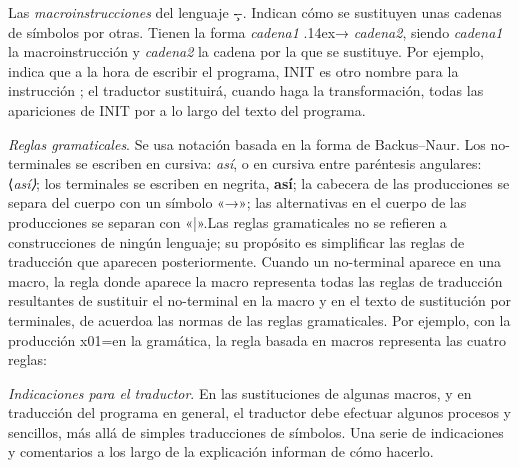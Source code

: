 \listademos
{}

Las {\it macroinstrucciones} del lenguaje \c--. Indican cómo se sustituyen unas cadenas de símbolos
por otras. Tienen la forma {\hskip3pt{\it cadena1} {\fflecha\lower.14ex\hbox{→}} {\it cadena2}},
siendo {\it cadena1} la macroinstrucción y {\it cadena2} la cadena por la que se sustituye. Por
ejemplo,  indica que a la hora de escribir el programa, {\fcode INIT} es otro
nombre para la instrucción {}; el traductor sustituirá, cuando haga la transformación, todas
las apariciones de {\fcode INIT} por {} a lo largo del texto del programa.

{\it Reglas gramaticales}. Se usa notación basada en la forma de Backus–Naur.  Los no-terminales se
escriben en cursiva: {\it así}, o en cursiva entre paréntesis angulares: {\fcode⟨\it así\fcode⟩};
los terminales se escriben en negrita, {\bf así}; la cabecera de las producciones se separa del
cuerpo con un símbolo «→»; las alternativas en el cuerpo de las producciones se separan con
«{\fcode|}».\pseudopar Las reglas gramaticales no se refieren a construcciones de ningún lenguaje;
su propósito es simplificar las reglas de traducción que aparecen posteriormente. Cuando un
no-terminal aparece en una macro, la regla donde aparece la macro representa todas las reglas de
traducción resultantes de sustituir el no-terminal en la macro y en el texto de sustitución por
terminales, de acuerdoa las normas de las reglas gramaticales. Por ejemplo, con la
producción \gramatprod x01=\estrella \fin en la gramática, la regla basada en macros
{  representa las cuatro
reglas:\hfil{}}

{\it Indicaciones para el traductor}. En las sustituciones de algunas macros, y en traducción del
programa en general, el traductor debe efectuar algunos procesos y sencillos, más allá de simples
traducciones de símbolos. Una serie de indicaciones y comentarios a los largo de la explicación
informan de cómo hacerlo.

